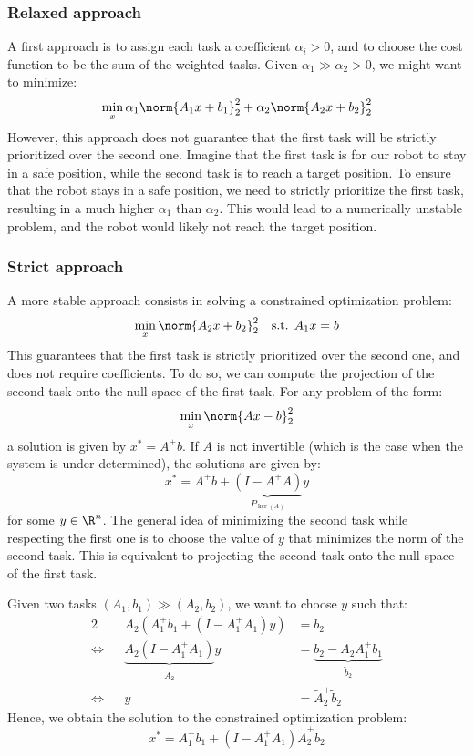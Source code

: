 \subsubsection{Relaxed approach}
A first approach is to assign each task a coefficient $\alpha_i>0$, and to choose the cost function to be the sum of the weighted tasks. Given $\alpha_1\gg\alpha_2>0$, we might want to minimize:
\begin{equation*}
    \min_x\alpha_1\norm{A_1x+b_1}_2^2 + \alpha_2\norm{A_2x+b_2}_2^2
\end{equation*}
However, this approach does not guarantee that the first task will be strictly prioritized over the second one. Imagine that the first task is for our robot to stay in a safe position, while the second task is to reach a target position. To ensure that the robot stays in a safe position, we need to strictly prioritize the first task, resulting in a much higher $\alpha_1$ than $\alpha_2$. This would lead to a numerically unstable problem, and the robot would likely not reach the target position.

\subsubsection{Strict approach}
A more stable approach consists in solving a constrained optimization problem:
\begin{equation*}
    \min_x\norm{A_2x+b_2}_2^2 \quad\text{s.t. } A_1x=b
\end{equation*}
This guarantees that the first task is strictly prioritized over the second one, and does not require coefficients. To do so, we can compute the projection of the second task onto the null space of the first task. For any problem of the form:
\begin{equation*}
    \min_x\norm{Ax-b}_2^2
\end{equation*}
a solution is given by $x^*=A^+b$. If $A$ is not invertible (which is the case when the system is under determined), the solutions are given by:
\begin{equation*}
    x^* = A^+b + \underbrace{(I-A^+A)}_{P_{\ker(A)}}y
\end{equation*}
for some $y\in\R^n$. The general idea of minimizing the second task while respecting the first one is to choose the value of $y$ that minimizes the norm of the second task. This is equivalent to projecting the second task onto the null space of the first task.

Given two tasks $(A_1, b_1)\gg(A_2, b_2)$, we want to choose $y$ such that:
\begin{alignat*}{2}
    &&A_2(A_1^+b_1 + (I-A_1^+A_1)y) &= b_2\\
    \iff &&\underbrace{A_2(I-A_1^+A_1)}_{\tilde{A}_2}y &= \underbrace{b_2 - A_2A_1^+b_1}_{\tilde{b}_2}\\
    \iff &&y &= \tilde{A}_2^+\tilde{b}_2
\end{alignat*}
Hence, we obtain the solution to the constrained optimization problem:
\begin{equation*}
    x^* = A_1^+b_1 + (I-A_1^+A_1)\tilde{A}_2^+\tilde{b}_2
\end{equation*}